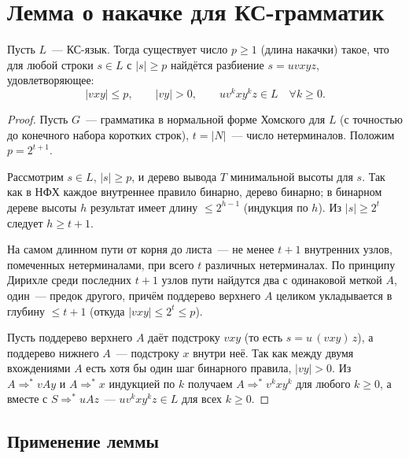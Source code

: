 \documentclass[12pt]{article}
\begin{document}
    \section{Лемма о накачке для КС-грамматик}
    
    \begin{lemma}
    	Пусть $L$~--- КС-язык. Тогда существует число $p \geqslant 1$ (длина накачки) такое, что для любой строки $s \in L$ с $|s| \geqslant p$ найдётся разбиение $s = uvxyz$, удовлетворяющее:
    	\[
    	|vxy| \leqslant p, \qquad |vy| > 0, \qquad uv^kxy^kz \in L \quad \forall k \geqslant 0.
    	\]
    \end{lemma}
    
    \begin{proof}
    	Пусть $G$~--- грамматика в нормальной форме Хомского для $L$ (с точностью до конечного набора коротких строк), $t = |N|$~--- число нетерминалов. Положим $p = 2^{t+1}$.
    	
    	Рассмотрим $s \in L$, $|s| \geqslant p$, и дерево вывода $T$ минимальной высоты для $s$. Так как в НФХ каждое внутреннее правило бинарно, дерево бинарно; в бинарном дереве высоты $h$ результат имеет длину $\leqslant 2^{h-1}$ (индукция по $h$). Из $|s| \geqslant 2^t$ следует $h \geqslant t+1$.
    	
    	На самом длинном пути от корня до листа~--- не менее $t+1$ внутренних узлов, помеченных нетерминалами, при всего $t$ различных нетерминалах. По принципу Дирихле среди последних $t+1$ узлов пути найдутся два с одинаковой меткой $A$, один~--- предок другого, причём поддерево верхнего $A$ целиком укладывается в глубину $\leqslant t+1$ (откуда $|vxy| \leqslant 2^t \leqslant p$).
    	
    	Пусть поддерево верхнего $A$ даёт подстроку $vxy$ (то есть $s = u\,(vxy)\,z$), а поддерево нижнего $A$~--- подстроку $x$ внутри неё. Так как между двумя вхождениями $A$ есть хотя бы один шаг бинарного правила, $|vy| > 0$. Из $A \Rightarrow^* vAy$ и $A \Rightarrow^* x$ индукцией по $k$ получаем $A \Rightarrow^* v^kxy^k$ для любого $k \geqslant 0$, а вместе с $S \Rightarrow^* uAz$~--- $uv^kxy^kz \in L$ для всех $k \geqslant 0$.
    \end{proof}
    
    \subsection{Применение леммы}
    
\end{document}
